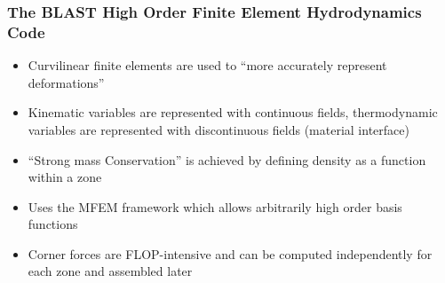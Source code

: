 \documentclass[8pt,xcolor=svgnames]{beamer}
\begin{document}
\begin{frame}\frametitle{ The BLAST High Order Finite Element Hydrodynamics Code}

\begin{itemize}
  \item Curvilinear finite elements are used to ``more accurately represent deformations''
  \item Kinematic variables are represented with  continuous fields, thermodynamic variables are represented with discontinuous fields (material interface)
  \item ``Strong mass Conservation'' is achieved by defining density as a function within a zone
  \item Uses the MFEM framework which allows arbitrarily high order  basis functions
  \item Corner forces are FLOP-intensive and can be computed independently for each zone and assembled later

\end{itemize}


\end{frame}
\end{document}
